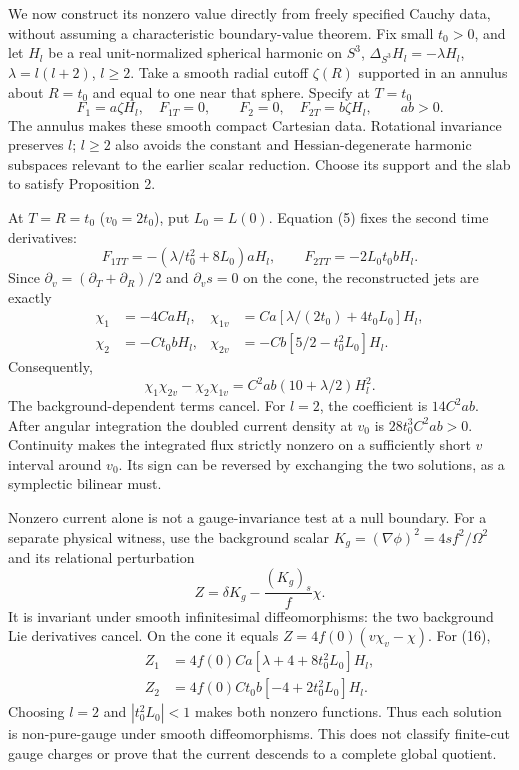 \documentclass[
  10pt,
]{article}
\begin{document}
We now construct its nonzero value directly from freely specified Cauchy
data, without assuming a characteristic boundary-value theorem. Fix
small \(t_0>0\), and let \(H_l\) be a real unit-normalized spherical
harmonic on \(S^3\), \(\Delta_{S^3}H_l=-\lambda H_l\),
\(\lambda=l(l+2)\), \(l\ge2\). Take a smooth radial cutoff \(\zeta(R)\)
supported in an annulus about \(R=t_0\) and equal to one near that
sphere. Specify at \(T=t_0\) \[
 F_1=a\zeta H_l,\quad F_{1T}=0,\qquad
 F_2=0,\quad F_{2T}=b\zeta H_l,\qquad ab>0.                    \tag{15}
\] The annulus makes these smooth compact Cartesian data. Rotational
invariance preserves \(l\); \(l\ge2\) also avoids the constant and
Hessian-degenerate harmonic subspaces relevant to the earlier scalar
reduction. Choose its support and the slab to satisfy Proposition 2.

At \(T=R=t_0\) (\(v_0=2t_0\)), put \(L_0=L(0)\). Equation (5) fixes the
second time derivatives: \[
 F_{1TT}=-(\lambda/t_0^2+8L_0)aH_l,
 \qquad F_{2TT}=-2L_0t_0bH_l.
\] Since \(\partial_v=(\partial_T+\partial_R)/2\) and \(\partial_vs=0\)
on the cone, the reconstructed jets are exactly \[
 \begin{aligned}
 \chi_1&=-4CaH_l,&
 \chi_{1v}&=Ca[\lambda/(2t_0)+4t_0L_0]H_l,\\
 \chi_2&=-Ct_0bH_l,&
 \chi_{2v}&=-Cb[5/2-t_0^2L_0]H_l.
 \end{aligned}                                                \tag{16}
\] Consequently, \[
 \boxed{\chi_1\chi_{2v}-\chi_2\chi_{1v}
       =C^2ab(10+\lambda/2)H_l^2.}                            \tag{17}
\] The background-dependent terms cancel. For \(l=2\), the coefficient
is \(14C^2ab\). After angular integration the doubled current density at
\(v_0\) is \(28t_0^3C^2ab>0\). Continuity makes the integrated flux
strictly nonzero on a sufficiently short \(v\) interval around \(v_0\).
Its sign can be reversed by exchanging the two solutions, as a
symplectic bilinear must.

Nonzero current alone is not a gauge-invariance test at a null boundary.
For a separate physical witness, use the background scalar
\(K_g=(\nabla\phi)^2=4sf^2/\Omega^2\) and its relational perturbation \[
 Z=\delta K_g-\frac{(K_g)_s}{f}\chi.                          \tag{18}
\] It is invariant under smooth infinitesimal diffeomorphisms: the two
background Lie derivatives cancel. On the cone it equals
\(Z=4f(0)(v\chi_v-\chi)\). For (16), \[
 \begin{aligned}
 Z_1&=4f(0)Ca[\lambda+4+8t_0^2L_0]H_l,\\
 Z_2&=4f(0)Ct_0b[-4+2t_0^2L_0]H_l.
 \end{aligned}                                                \tag{19}
\] Choosing \(l=2\) and \(|t_0^2L_0|<1\) makes both nonzero functions.
Thus each solution is non-pure-gauge under smooth diffeomorphisms. This
does not classify finite-cut gauge charges or prove that the current
descends to a complete global quotient.
\end{document}
